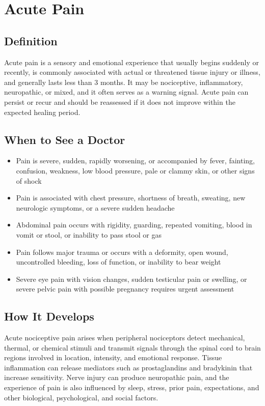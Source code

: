\chapter{Acute Pain}

\section*{Definition}
Acute pain is a sensory and emotional experience that usually begins suddenly or recently, is commonly associated with actual or threatened tissue injury or illness, and generally lasts less than 3 months. It may be nociceptive, inflammatory, neuropathic, or mixed, and it often serves as a warning signal. Acute pain can persist or recur and should be reassessed if it does not improve within the expected healing period.

\section*{When to See a Doctor}

\begin{itemize}
 \item Pain is severe, sudden, rapidly worsening, or accompanied by fever, fainting, confusion, weakness, low blood pressure, pale or clammy skin, or other signs of shock
 \item Pain is associated with chest pressure, shortness of breath, sweating, new neurologic symptoms, or a severe sudden headache
 \item Abdominal pain occurs with rigidity, guarding, repeated vomiting, blood in vomit or stool, or inability to pass stool or gas
 \item Pain follows major trauma or occurs with a deformity, open wound, uncontrolled bleeding, loss of function, or inability to bear weight
 \item Severe eye pain with vision changes, sudden testicular pain or swelling, or severe pelvic pain with possible pregnancy requires urgent assessment
\end{itemize}

\section*{How It Develops}
Acute nociceptive pain arises when peripheral nociceptors detect mechanical, thermal, or chemical stimuli and transmit signals through the spinal cord to brain regions involved in location, intensity, and emotional response. Tissue inflammation can release mediators such as prostaglandins and bradykinin that increase sensitivity. Nerve injury can produce neuropathic pain, and the experience of pain is also influenced by sleep, stress, prior pain, expectations, and other biological, psychological, and social factors.

